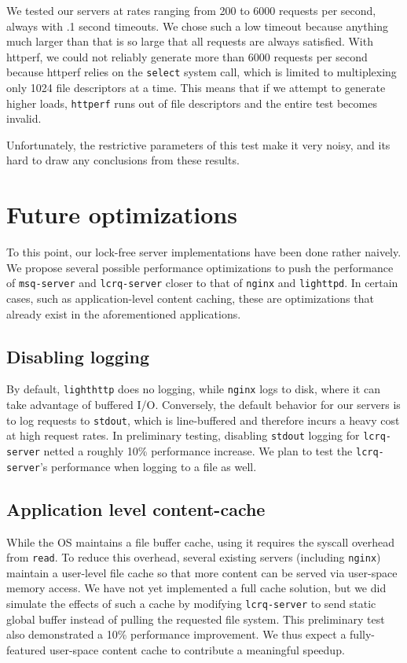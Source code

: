 \documentclass[twoside,10pt]{article}
\begin{document}
\begin{multicols}{2}
We tested our servers at rates ranging from 200 to 6000 requests per
second, always with .1 second timeouts. We chose such a low timeout
because anything much larger than that is so large that all requests
are always satisfied. With httperf, we could not reliably generate
more than 6000 requests per second because httperf relies on the
\verb+select+ system call, which is limited to multiplexing only 1024
file descriptors at a time. This means that if we attempt to generate
higher loads, \verb+httperf+ runs out of file descriptors and the
entire test becomes invalid.

Unfortunately, the restrictive parameters of this test make it very noisy, 
and its hard to draw any conclusions from these results. 

\section{Future optimizations}

To this point, our lock-free server implementations have been done
rather naively. We propose several possible performance optimizations
to push the performance of \verb+msq-server+ and \verb+lcrq-server+
closer to that of \verb+nginx+ and \verb+lighttpd+. In certain cases,
such as application-level content caching, these are optimizations
that already exist in the aforementioned applications.

\subsection{Disabling logging}
By default, \verb+lighthttp+ does no logging, while \verb+nginx+ logs
to disk, where it can take advantage of buffered I/O. Conversely, the
default behavior for our servers is to log requests to \verb+stdout+,
which is line-buffered and therefore incurs a heavy cost at high
request rates. In preliminary testing, disabling \verb+stdout+ logging
for \verb+lcrq-server+ netted a roughly 10\% performance increase. We
plan to test the \verb+lcrq-server+'s performance when logging to a
file as well.

\subsection{Application level content-cache}
While the OS maintains a file buffer cache, using it requires the
syscall overhead from \verb+read+. To reduce this overhead, several
existing servers (including \verb+nginx+) maintain a user-level file
cache so that more content can be served via user-space memory
access. We have not yet implemented a full cache solution, but we did
simulate the effects of such a cache by modifying \verb+lcrq-server+
to send static global buffer instead of pulling the requested file
system. This preliminary test also demonstrated a 10\% performance
improvement. We thus expect a fully-featured user-space content cache
to contribute a meaningful speedup.


\end{multicols}
\end{document}
